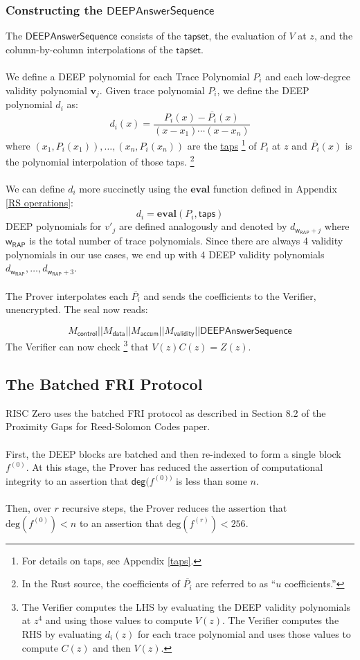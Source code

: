 \documentclass[10pt,letterpaper,titlepage]{article}
\theoremstyle{definition}
\begin{document}
\begin{appendices}
\subsubsection{Constructing the $\mathsf{DEEPAnswerSequence}$}
The $\mathsf{DEEPAnswerSequence}$ consists of the $\mathsf{tapset}$, the evaluation of $V$ at $z$, and the column-by-column interpolations of the $\mathsf{tapset}$.\\
\label{DEEP Polynomials}
\\
We define a DEEP polynomial for each Trace Polynomial $P_i$ and each low-degree validity polynomial $\mathbf{v}_j$. Given trace polynomial $P_i$, we define the DEEP polynomial $d_i$ as: 
\[d_i(x)=\frac{P_i(x)-\overline{P_i}(x)}{(x-x_1)\cdots(x-x_n)}\]
where $(x_1,P_i(x_1)),\ldots,(x_n,P_i(x_n))$ are the \hyperref[taps]{taps}%
\footnote{For details on taps, see Appendix \ref*{taps}.} 
of $P_i$ at $z$ and $\overline{P_i}(x)$ is the polynomial interpolation of those taps.%
\footnote{In the Rust source, the coefficients of $\overline{P_i}$ are referred to as ``$u$ coefficients.'' }
\\
\\
We can define $d_i$ more succinctly using the $\textbf{eval}$ function defined in Appendix \ref{RS operations}:
\[
  d_i=
  \mathbf{eval}(
    P_i,
    \mathsf{taps}
  )\]
DEEP polynomials for $v'_j$ are defined analogously and denoted by $d_{\mathsf{w}_\mathsf{RAP}+j}$ where $\mathsf{w}_\mathsf{RAP}$ is the total number of trace polynomials. 
Since there are always 4 validity polynomials in our use cases, we end up with 4 DEEP validity polynomials $d_{\mathsf{w}_\mathsf{RAP}},\ldots,d_{\mathsf{w}_\mathsf{RAP}+3}$. \\
\\
The Prover interpolates each $\overline{P_i}$ and sends the coefficients to the Verifier, unencrypted. The seal now reads: 

\[
  M_\mathsf{control}||
  M_\mathsf{data}||
  M_\mathsf{accum}||
  M_\mathsf{validity}||
  \mathsf{DEEPAnswerSequence}
\]
The Verifier can now check%
\footnote{
  The Verifier computes the LHS by evaluating the DEEP validity polynomials at $z^4$ and using those values to compute $V(z)$. 
  The Verifier computes the RHS by evaluating $d_i(z)$ for each trace polynomial and uses those values to compute $C(z)$ and then $V(z)$.
  }
that $V(z)C(z)=Z(z)$. 
\subsection{The Batched FRI Protocol}
\label{FRI}
RISC Zero uses the batched FRI protocol as described in Section 8.2 of the Proximity Gaps for Reed-Solomon Codes paper. \\
\\
First, the DEEP blocks are batched and then re-indexed to form a single block $f^{(0)}$. 
At this stage, the Prover has reduced the assertion of computational integrity to an assertion that $\mathsf{deg}(f^{(0))}$ is less than some $n$. \\
\\
Then, over $r$ recursive steps, the Prover reduces the assertion that $\text{deg}(f^{(0)})<n$ to an assertion that $\text{deg}(f^{(r)})<256$. 

\end{appendices}
\end{document}
